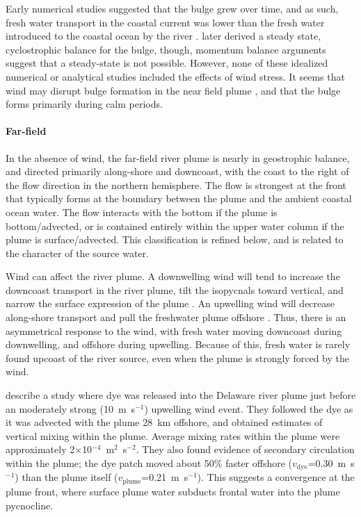 \documentclass[11pt]{report}
\numberwithin{equation}{section}
\begin{document}
Early numerical studies suggested that the bulge grew over time, and as such, fresh water transport in the coastal current was lower than the fresh water introduced to the coastal ocean by the river \citep{fong.geyer:02}.  \citet{yankovsky.chapman:97} later derived a steady state, cyclostrophic balance for the bulge, though, momentum balance arguments \citep{nof.pichevin:01} suggest that a steady-state is not possible.  However, none of these idealized numerical or analytical studies included the effects of wind stress.  It seems that wind may disrupt bulge formation in the near field plume \citep{chant.ea:08, horner-devine.ea:08}, and that the bulge forms primarily during calm periods.


\paragraph{Far-field}

In the absence of wind, the far-field river plume is nearly in geostrophic balance, and directed primarily along-shore and downcoast, with the coast to the right of the flow direction in the northern hemisphere.  The flow is strongest at the front that typically forms at the boundary between the plume and the ambient coastal ocean water.  The flow interacts with the bottom if the plume is bottom\-/advected, or is contained entirely within the upper water column if the plume is surface\-/advected.  This classification is refined below, and is related to the character of the source water.

Wind can affect the river plume.  A downwelling wind will tend to increase the downcoast transport in the river plume, tilt the isopycnals toward vertical, and narrow the surface expression of the plume \citep{pullen.allen:00, garcia-berdeal.ea:02}.  An upwelling wind will decrease along-shore transport and pull the freshwater plume offshore \citep{fong.geyer:01, lentz:04}.  Thus, there is an asymmetrical response to the wind, with fresh water moving downcoast during downwelling, and offshore during upwelling.  Because of this, fresh water is rarely found upcoast of the river source, even when the plume is strongly forced by the wind.

\citet{houghton.ea:04} describe a study where dye was released into the Delaware river plume just before an moderately strong (10~m~s$^{-1}$) upwelling wind event.  They followed the dye as it was advected with the plume 28~km offshore, and obtained estimates of vertical mixing within the plume.  Average mixing rates within the plume were approximately 2$\times$10$^{-4}$~m$^2$~s$^{-2}$. They also found evidence of secondary circulation within the plume; the dye patch moved about 50\% faster offshore ($v_\mathrm{dye}$=0.30~m~s$^{-1}$) than the plume itself ($v_\mathrm{plume}$=0.21~m~s$^{-1}$).  This suggests a convergence at the plume front, where surface plume water subducts frontal water into the plume pycnocline.
\end{document}
